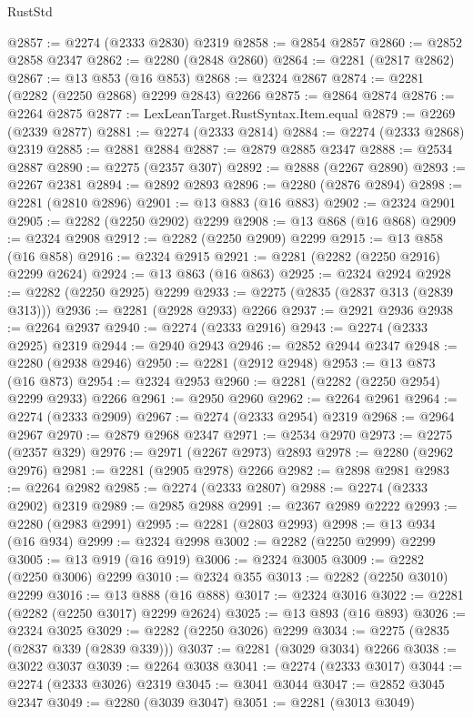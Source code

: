 \begin{lexlean}{RustStd}
\begin{coremodule}
@2857 := @2274 (@2333 @2830) @2319
@2858 := @2854 @2857
@2860 := @2852 @2858 @2347
@2862 := @2280 (@2848 @2860)
@2864 := @2281 (@2817 @2862)
@2867 := @13 @853 (@16 @853)
@2868 := @2324 @2867
@2874 := @2281 (@2282 (@2250 @2868) @2299 @2843) @2266
@2875 := @2864 @2874
@2876 := @2264 @2875
@2877 := LexLeanTarget.RustSyntax.Item.equal
@2879 := @2269 (@2339 @2877)
@2881 := @2274 (@2333 @2814)
@2884 := @2274 (@2333 @2868) @2319
@2885 := @2881 @2884
@2887 := @2879 @2885 @2347
@2888 := @2534 @2887
@2890 := @2275 (@2357 @307)
@2892 := @2888 (@2267 @2890)
@2893 := @2267 @2381
@2894 := @2892 @2893
@2896 := @2280 (@2876 @2894)
@2898 := @2281 (@2810 @2896)
@2901 := @13 @883 (@16 @883)
@2902 := @2324 @2901
@2905 := @2282 (@2250 @2902) @2299
@2908 := @13 @868 (@16 @868)
@2909 := @2324 @2908
@2912 := @2282 (@2250 @2909) @2299
@2915 := @13 @858 (@16 @858)
@2916 := @2324 @2915
@2921 := @2281 (@2282 (@2250 @2916) @2299 @2624)
@2924 := @13 @863 (@16 @863)
@2925 := @2324 @2924
@2928 := @2282 (@2250 @2925) @2299
@2933 := @2275 (@2835 (@2837 @313 (@2839 @313)))
@2936 := @2281 (@2928 @2933) @2266
@2937 := @2921 @2936
@2938 := @2264 @2937
@2940 := @2274 (@2333 @2916)
@2943 := @2274 (@2333 @2925) @2319
@2944 := @2940 @2943
@2946 := @2852 @2944 @2347
@2948 := @2280 (@2938 @2946)
@2950 := @2281 (@2912 @2948)
@2953 := @13 @873 (@16 @873)
@2954 := @2324 @2953
@2960 := @2281 (@2282 (@2250 @2954) @2299 @2933) @2266
@2961 := @2950 @2960
@2962 := @2264 @2961
@2964 := @2274 (@2333 @2909)
@2967 := @2274 (@2333 @2954) @2319
@2968 := @2964 @2967
@2970 := @2879 @2968 @2347
@2971 := @2534 @2970
@2973 := @2275 (@2357 @329)
@2976 := @2971 (@2267 @2973) @2893
@2978 := @2280 (@2962 @2976)
@2981 := @2281 (@2905 @2978) @2266
@2982 := @2898 @2981
@2983 := @2264 @2982
@2985 := @2274 (@2333 @2807)
@2988 := @2274 (@2333 @2902) @2319
@2989 := @2985 @2988
@2991 := @2367 @2989 @2222
@2993 := @2280 (@2983 @2991)
@2995 := @2281 (@2803 @2993)
@2998 := @13 @934 (@16 @934)
@2999 := @2324 @2998
@3002 := @2282 (@2250 @2999) @2299
@3005 := @13 @919 (@16 @919)
@3006 := @2324 @3005
@3009 := @2282 (@2250 @3006) @2299
@3010 := @2324 @355
@3013 := @2282 (@2250 @3010) @2299
@3016 := @13 @888 (@16 @888)
@3017 := @2324 @3016
@3022 := @2281 (@2282 (@2250 @3017) @2299 @2624)
@3025 := @13 @893 (@16 @893)
@3026 := @2324 @3025
@3029 := @2282 (@2250 @3026) @2299
@3034 := @2275 (@2835 (@2837 @339 (@2839 @339)))
@3037 := @2281 (@3029 @3034) @2266
@3038 := @3022 @3037
@3039 := @2264 @3038
@3041 := @2274 (@2333 @3017)
@3044 := @2274 (@2333 @3026) @2319
@3045 := @3041 @3044
@3047 := @2852 @3045 @2347
@3049 := @2280 (@3039 @3047)
@3051 := @2281 (@3013 @3049)

\end{coremodule}
\end{lexlean}
